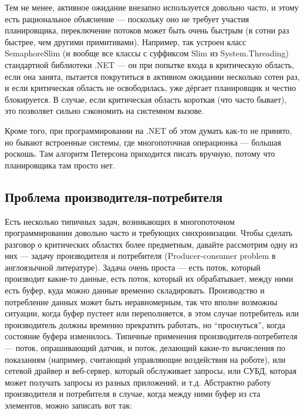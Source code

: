 \documentclass{../../text-style}
\begin{document}
Тем не менее, активное ожидание внезапно используется довольно часто, и этому есть рациональное объяснение --- поскольку оно не требует участия планировщика, переключение потоков может быть очень быстрым (в сотни раз быстрее, чем другими примитивами). Например, так устроен класс SemaphoreSlim (и вообще все классы с суффиксом Slim из System.Threading) стандартной библиотеки .NET --- он при попытке входа в критическую область, если она занята, пытается покрутиться в активном ожидании несколько сотен раз, и если критическая область не освободилась, уже дёргает планировщик и честно блокируется. В случае, если критическая область короткая (что часто бывает), это позволяет сильно сэкономить на системном вызове.

Кроме того, при программировании на .NET об этом думать как-то не принято, но бывают встроенные системы, где многопоточная операционка --- большая роскошь. Там алгоритм Петерсона приходится писать вручную, потому что планировщика там просто нет.

\subsection{Проблема производителя-потребителя}

Есть несколько типичных задач, возникающих в многопоточном программировании довольно часто и требующих синхронизации. Чтобы сделать разговор о критических областях более предметным, давайте рассмотрим одну из них --- задачу производителя и потребителя (Producer-consumer problem в англоязычной литературе). Задача очень проста --- есть поток, который производит какие-то данные, есть поток, который их обрабатывает, между ними есть буфер, куда можно данные временно складировать. Производство и потребление данных может быть неравномерным, так что вполне возможны ситуации, когда буфер пустеет или переполняется, в этом случае потребитель или производитель должны временно прекратить работать, но \enquote{проснуться}, когда состояние буфера изменилось. Типичные применения производителя-потребителя --- поток, опрашивающий датчик, и поток, делающий какие-то вычисления по показаниям (например, считающий управляющие воздействия на роботе), или сетевой драйвер и веб-сервер, который обслуживает запросы, или СУБД, которая может получать запросы из разных приложений, и т.д. Абстрактно работу производителя и потребителя в случае, когда между ними буфер из ста элементов, можно записать вот так:
\end{document}
